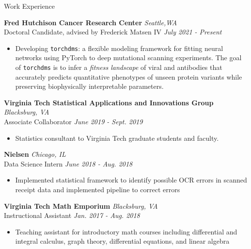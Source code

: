\documentclass{resume} %
\begin{document}
\begin{rSection}{Work Experience}

{\bf Fred Hutchison Cancer Research Center} \hfill { \em Seattle,WA}\\
{Doctoral Candidate, advised by Frederick Matsen IV} \hfill {\em July 2021 - Present}
\begin{itemize}
    \item Developing \texttt{torchdms}: a flexible modeling framework for fitting neural networks using PyTorch to deep mutational scanning experiments.
    The goal of \texttt{torchdms} is to infer a \emph{fitness landscape} of viral and antibodies that accurately predicts quantitative phenotypes of unseen protein variants while preserving biophysically interpretable parameters.
\end{itemize}

{\bf Virginia Tech Statistical Applications and Innovations Group} \hfill {\em Blacksburg, VA} \\
{Associate Collaborator} \hfill {\em June 2019 - Sept. 2019}
\begin{itemize}
    \item Statistics consultant to Virginia Tech graduate students and faculty.
\end{itemize}

{\bf Nielsen} \hfill {\em Chicago, IL} \\
{Data Science Intern} \hfill {\em June 2018 - Aug. 2018}
\begin{itemize}
    \item Implemented statistical framework to identify possible OCR errors in scanned receipt data and implemented pipeline to correct errors
    \end{itemize}

{\bf Virginia Tech Math Emporium} \hfill {\em Blacksburg, VA} \\
{Instructional Assistant} \hfill {\em Jan. 2017 - Aug. 2018}
\begin{itemize}
    \item Teaching assistant for introductory math courses including differential and integral calculus, graph theory, differential equations, and linear algebra
\end{itemize}
\end{rSection}



\end{document}
